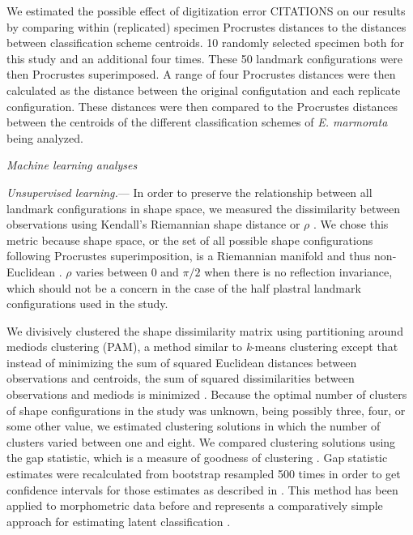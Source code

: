 \documentclass[12pt,letterpaper]{article}
\renewcommand{\subsection}[1]{%
\bigskip
\begin{center}
\begin{large}
\normalfont\itshape #1
\end{large}
\end{center}}
\renewcommand{\subsubsection}[1]{%
\vspace{2ex}
\noindent
\textit{#1.}---}
\begin{document}
We estimated the possible effect of digitization error CITATIONS on our results by comparing within (replicated) specimen Procrustes distances to the distances between classification scheme centroids. 10 randomly selected specimen both for this study and an additional four times. These 50 landmark configurations were then Procrustes superimposed. A range of four Procrustes distances were then calculated as the distance between the original configutation and each replicate configuration. These distances were then compared to the Procrustes distances between the centroids of the different classification schemes of \textit{E. marmorata} being analyzed.


\subsection{Machine learning analyses}
\subsubsection{Unsupervised learning}
In order to preserve the relationship between all landmark configurations in shape space, we measured the dissimilarity between observations using Kendall's Riemannian shape distance or \(\rho\) \citep{Kendall1984a,Dryden1998a}. We chose this metric because shape space, or the set of all possible shape configurations following Procrustes superimposition, is a Riemannian manifold and thus non-Euclidean \citep{Dryden1998a}. \(\rho\) varies between 0 and \(\pi / 2\) when there is no reflection invariance, which should not be a concern in the case of the half plastral landmark configurations used in the study.

We divisively clustered the shape dissimilarity matrix using partitioning around mediods clustering (PAM), a method similar to \textit{k}-means clustering except that instead of minimizing the sum of squared Euclidean distances between observations and centroids, the sum of squared dissimilarities between observations and mediods is minimized \citep{Kaufman1990}. Because the optimal number of clusters of shape configurations in the study was unknown, being possibly three, four, or some other value, we estimated clustering solutions in which the number of clusters varied between one and eight. We compared clustering solutions using the gap statistic, which is a measure of goodness of clustering \citep{Tibshirani2001a}. Gap statistic estimates were recalculated from bootstrap resampled 500 times in order to get confidence intervals for those estimates as described in \citet{Tibshirani2001a}. This method has been applied to morphometric data before and represents a comparatively simple approach for estimating latent classification \citep{Claude2008}.
\end{document}
